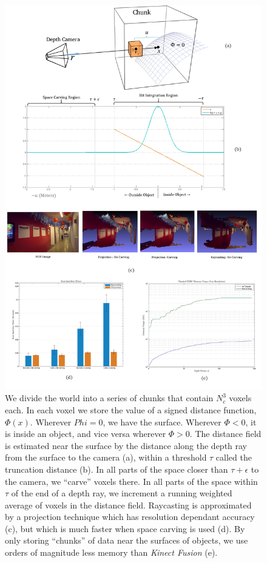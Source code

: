 \documentclass[conference,letterpaper]{IEEEtran}
\begin{document}
\begin{figure}[!t]
\centering
\includegraphics[width=0.62\linewidth]{img/bigpicture} 
\caption{We divide the world into a series of chunks that contain $N_c^3$
voxels each. In each voxel we store the value of a signed distance function,
$\Phi(x)$. Wherever $Phi=0$, we have the surface. Wherever $\Phi < 0$, it is
inside an object, and vice versa wherever $\Phi > 0$. The distance field is
estimated near the surface by the distance along the depth ray from the surface
to the camera (a), within a threshold $\tau$ called the truncation distance
(b). In all parts of the space closer than $\tau + \epsilon$ to the camera, we
``carve'' voxels there. In all parts of the space within $\tau$ of the end of a
depth ray, we increment a running weighted average of voxels in the distance
field. Raycasting is approximated by a projection technique which has
resolution dependant accuracy (c), but which is much faster when space carving
is used (d). By only storing ``chunks'' of data near the surfaces of objects,
we use orders of magnitude less memory than \textit{Kinect Fusion} (e).}
\label{summary}
\end{figure}



%
\end{document}
